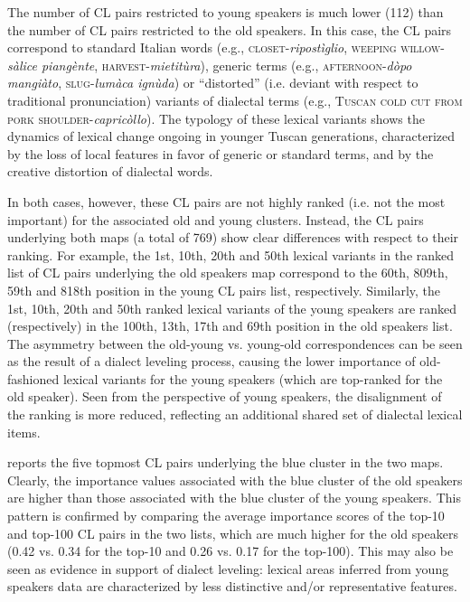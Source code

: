 \documentclass[output=paper]{LSP/langsci}
\begin{document}
The number of CL pairs restricted to young speakers is much lower (112) than the number of CL pairs restricted to the old speakers. In this case, the CL pairs correspond to standard Italian words (e.g., \textsc{closet}{}-\textit{ripostìglio}, \textsc{weeping willow}{}-\textit{sàlice piangènte}, \textsc{harvest}{}-\textit{mietitùra}), generic terms (e.g., \textsc{afternoon}{}-\textit{dòpo mangiàto}, \textsc{slug}{}-\textit{lumàca ignùda}) or “distorted” (i.e. deviant with respect to traditional pronunciation) variants of dialectal terms (e.g., \textsc{Tuscan cold cut from pork shoulder}{}-\textit{capricòllo}). The typology of these lexical variants shows the dynamics of lexical change ongoing in younger Tuscan generations, characterized by the loss of local features in favor of generic or standard terms, and by the creative distortion of dialectal words. 

In both cases, however, these CL pairs are not highly ranked (i.e. not the most important) for the associated old and young clusters. Instead, the CL pairs underlying both maps (a total of 769) show clear differences with respect to their ranking. For example, the 1st, 10th, 20th and 50th lexical variants in the ranked list of CL pairs underlying the old speakers map correspond to the 60th, 809th, 59th and 818th position in the young CL pairs list, respectively. Similarly, the 1st, 10th, 20th and 50th ranked lexical variants of the young speakers are ranked (respectively) in the 100th, 13th, 17th and 69th position in the old speakers list. The asymmetry between the old-young vs. young-old correspondences can be seen as the result of a dialect leveling process, causing the lower importance of old-fashioned lexical variants for the young speakers (which are top-ranked for the old speaker). Seen from the perspective of young speakers, the disalignment of the ranking is more reduced, reflecting an additional shared set of dialectal lexical items.

 reports the five topmost CL pairs underlying the blue cluster in the two maps. Clearly, the importance values associated with the blue cluster of the old speakers are higher than those associated with the blue cluster of the young speakers. This pattern is confirmed by comparing the average importance scores of the top-10 and top-100 CL pairs in the two lists, which are much higher for the old speakers (0.42 vs. 0.34 for the top-10 and 0.26 vs. 0.17 for the top-100). This may also be seen as evidence in support of dialect leveling: lexical areas inferred from young speakers data are characterized by less distinctive and/or representative features. 
\end{document}

